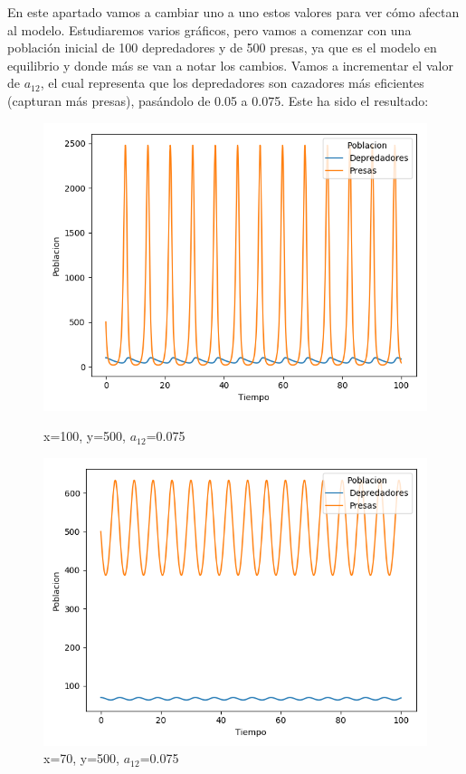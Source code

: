 \documentclass[11pt,a4paper]{article}
\begin{document}
En este apartado vamos a cambiar uno a uno estos valores para ver cómo afectan al modelo. Estudiaremos varios gráficos, pero vamos a comenzar
con una población inicial de 100 depredadores y de 500 presas, ya que es el modelo en equilibrio y donde más se van a notar los cambios. Vamos
a incrementar el valor de $a_{12}$, el cual representa que los depredadores son cazadores más eficientes (capturan más presas), pasándolo de
0.05 a 0.075. Este ha sido el resultado:
\begin{figure}[H]
	\centering
	\begin{minipage}{0.5\textwidth}
		\centering
		\includegraphics[scale=0.4]{img/4-a12-100-500.png}
		\caption{x=100, y=500, $a_{12}$=0.075}
	\end{minipage}%
	\begin{minipage}{0.5\textwidth}
		\centering
		\includegraphics[scale=0.4]{img/4-a12-70-500.png}
		\caption{x=70, y=500, $a_{12}$=0.075}
	\end{minipage}
\end{figure}
\end{document}
